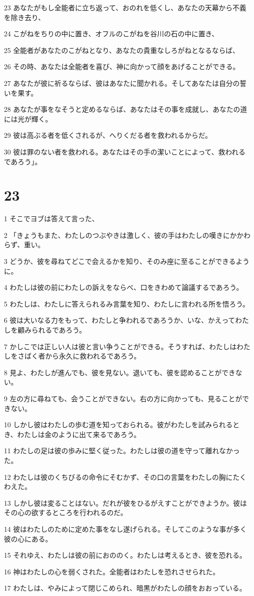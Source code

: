 \par 23 あなたがもし全能者に立ち返って、おのれを低くし、あなたの天幕から不義を除き去り、
\par 24 こがねをちりの中に置き、オフルのこがねを谷川の石の中に置き、
\par 25 全能者があなたのこがねとなり、あなたの貴重なしろがねとなるならば、
\par 26 その時、あなたは全能者を喜び、神に向かって顔をあげることができる。
\par 27 あなたが彼に祈るならば、彼はあなたに聞かれる。そしてあなたは自分の誓いを果す。
\par 28 あなたが事をなそうと定めるならば、あなたはその事を成就し、あなたの道には光が輝く。
\par 29 彼は高ぶる者を低くされるが、へりくだる者を救われるからだ。
\par 30 彼は罪のない者を救われる。あなたはその手の潔いことによって、救われるであろう」。

\chapter{23}

\par 1 そこでヨブは答えて言った、
\par 2 「きょうもまた、わたしのつぶやきは激しく、彼の手はわたしの嘆きにかかわらず、重い。
\par 3 どうか、彼を尋ねてどこで会えるかを知り、そのみ座に至ることができるように。
\par 4 わたしは彼の前にわたしの訴えをならべ、口をきわめて論議するであろう。
\par 5 わたしは、わたしに答えられるみ言葉を知り、わたしに言われる所を悟ろう。
\par 6 彼は大いなる力をもって、わたしと争われるであろうか、いな、かえってわたしを顧みられるであろう。
\par 7 かしこでは正しい人は彼と言い争うことができる。そうすれば、わたしはわたしをさばく者から永久に救われるであろう。
\par 8 見よ、わたしが進んでも、彼を見ない。退いても、彼を認めることができない。
\par 9 左の方に尋ねても、会うことができない。右の方に向かっても、見ることができない。
\par 10 しかし彼はわたしの歩む道を知っておられる。彼がわたしを試みられるとき、わたしは金のように出て来るであろう。
\par 11 わたしの足は彼の歩みに堅く従った。わたしは彼の道を守って離れなかった。
\par 12 わたしは彼のくちびるの命令にそむかず、その口の言葉をわたしの胸にたくわえた。
\par 13 しかし彼は変ることはない。だれが彼をひるがえすことができようか。彼はその心の欲するところを行われるのだ。
\par 14 彼はわたしのために定めた事をなし遂げられる。そしてこのような事が多く彼の心にある。
\par 15 それゆえ、わたしは彼の前におののく。わたしは考えるとき、彼を恐れる。
\par 16 神はわたしの心を弱くされた。全能者はわたしを恐れさせられた。
\par 17 わたしは、やみによって閉じこめられ、暗黒がわたしの顔をおおっている。

